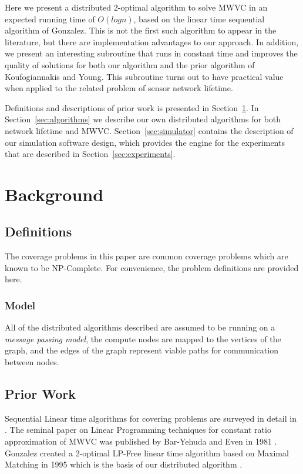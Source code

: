 Here we present a distributed 2-optimal algorithm to solve MWVC in an expected running time of $O(logn)$, based on the linear time sequential algorithm of Gonzalez\cite{Gonzalez1995129}. This is not the first such algorithm to appear in the literature, but there are implementation advantages to our approach. In addition, we present an interesting subroutine that runs in constant time and improves the quality of solutions for both our algorithm and the prior algorithm of Koufogiannakis and Young\cite{1582746}. This subroutine turns out to have practical value when applied to the related problem of sensor network lifetime.

Definitions and descriptions of prior work is presented in Section~\ref{sec:background}. In Section~\ref{sec:algorithms} we describe our own distributed algorithms for both network lifetime and MWVC. Section~\ref{sec:simulator} contains the description of our simulation software design, which provides the engine for the experiments that are described in Section~\ref{sec:experiments}.

\section{Background}
\label{sec:background}
\subsection{Definitions}
The coverage problems in this paper are common coverage problems which are known to be NP-Complete. For convenience, the problem definitions are provided here.




\subsubsection{Model}
\label{ssb:com-model}

All of the distributed algorithms described are assumed to be running on a {\em message passing model}, the compute nodes are mapped to the vertices of the graph, and the edges of the graph represent viable paths for communication between nodes. 

\subsection{Prior Work}

Sequential Linear time algorithms for covering problems are surveyed in detail in \cite{254190}. The seminal paper on Linear Programming techniques for constant ratio approximation of MWVC was published by Bar-Yehuda and Even in 1981 \cite{Bar-Yehuda:1981lr}. Gonzalez created a 2-optimal LP-Free linear time algorithm based on Maximal Matching in 1995 which is the basis of our distributed algorithm \cite{Gonzalez1995129}. 

